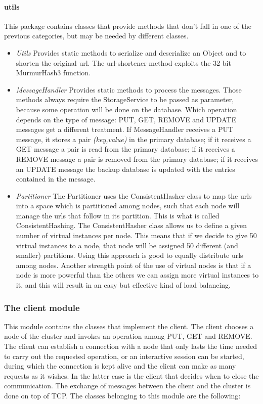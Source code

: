 \documentclass{article}
\begin{document}
\paragraph{utils} This package contains classes that provide methods that don't fall in one of the previous categories, but may be needed by different classes. 
\begin{itemize}
\item \textit{Utils} Provides static methods to serialize and deserialize an Object and to shorten the original url. The url-shortener method exploits the 32 bit MurmurHash3 function.
\item \textit{MessageHandler} Provides static methods to process the messages. Those methods always require the StorageService to be passed as parameter, because some operation will be done on the database. Which operation depends on the type of message: PUT, GET, REMOVE and UPDATE messages get a different treatment. If MessageHandler receives a PUT message, it stores a pair \textit{(key,value)} in the primary database; if it receives a GET message a pair is read from the primary database; if it receives a REMOVE message a pair is removed from the primary database; if it receives an UPDATE message the backup database is updated with the entries contained in the message.
\item \textit{Partitioner} The Partitioner uses the ConsistentHasher class to map the urls into a space which is partitioned among nodes, such that each node will manage the urls that follow in its partition. This is what is called ConsistentHashing. The ConsistentHasher class allows us to define a given number of virtual instances per node. This means that if we decide to give 50 virtual instances to a node, that node will be assigned 50 different (and smaller) partitions. Using this approach is good to equally distribute urls among nodes. Another strength point of the use of virtual nodes is that if a node is more powerful than the others we can assign more virtual instances to it, and this will result in an easy but effective kind of load balancing.
\end{itemize}



\subsubsection{The client module} 
This module contains the classes that implement the client. The client chooses a node of the cluster and invokes an operation among PUT, GET and REMOVE. The client can establish a connection with a node that only lasts the time needed to carry out the requested operation, or an interactive session can be started, during which the connection is kept alive and the client can make as many requests as it wishes. In the latter case is the client that decides when to close the communication. The exchange of messages between the client and the cluster is done on top of TCP. The classes belonging to this module are the following:
\end{document}
